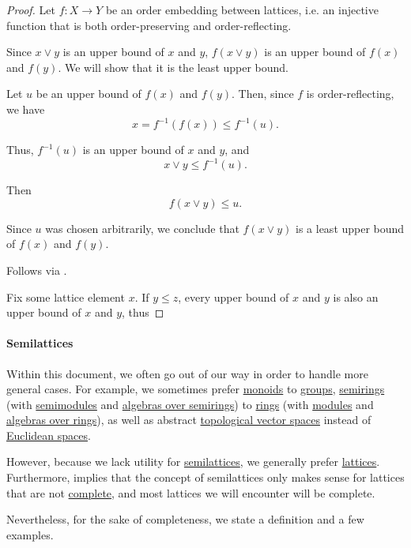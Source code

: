 \begin{proof}
   Let \( f: X \to Y \) be an order embedding between lattices, i.e. an injective function that is both order-preserving and order-reflecting.

   Since \( x \vee y \) is an upper bound of \( x \) and \( y \), \( f(x \vee y) \) is an upper bound of \( f(x) \) and \( f(y) \). We will show that it is the least upper bound.

  Let \( u \) be an upper bound of \( f(x) \) and \( f(y) \). Then, since \( f \) is order-reflecting, we have
  \begin{equation*}
    x = f^{-1}(f(x)) \leq f^{-1}(u).
  \end{equation*}

  Thus, \( f^{-1}(u) \) is an upper bound of \( x \) and \( y \), and
  \begin{equation*}
    x \vee y \leq f^{-1}(u).
  \end{equation*}

  Then
  \begin{equation*}
    f(x \vee y) \leq u.
  \end{equation*}

  Since \( u \) was chosen arbitrarily, we conclude that \( f(x \vee y) \) is a least upper bound of \( f(x) \) and \( f(y) \).

   Follows via .

   Fix some lattice element \( x \). If \( y \leq z \), every upper bound of \( x \) and \( y \) is also an upper bound of \( x \) and \( y \), thus
\end{proof}

\paragraph{Semilattices}

\begin{remark}\label{rem:semilattices}
  Within this document, we often go out of our way in order to handle more general cases. For example, we sometimes prefer \hyperref[def:monoid]{monoids} to \hyperref[def:group]{groups}, \hyperref[def:semiring]{semirings} (with \hyperref[def:semimodule]{semimodules} and \hyperref[def:algebra_over_semiring]{algebras over semirings}) to \hyperref[def:ring]{rings} (with \hyperref[def:modules]{modules} and \hyperref[def:algebra_over_ring]{algebras over rings}), as well as abstract \hyperref[def:topological_vector_space]{topological vector spaces} instead of \hyperref[def:euclidean_space]{Euclidean spaces}.

  However, because we lack utility for \hyperref[def:semilattice]{semilattices}, we generally prefer \hyperref[def:lattice]{lattices}. Furthermore,  implies that the concept of semilattices only makes sense for lattices that are not \hyperref[def:complete_lattice]{complete}, and most lattices we will encounter will be complete.

  Nevertheless, for the sake of completeness, we state a definition and a few examples.
\end{remark}

